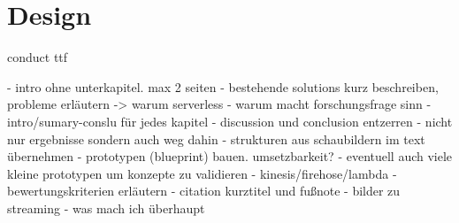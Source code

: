 \chapter{Design}

conduct ttf


- intro ohne unterkapitel. max 2 seiten
- bestehende solutions kurz beschreiben, probleme erläutern -> warum serverless
- warum macht forschungsfrage sinn
- intro/sumary-conslu für jedes kapitel
- discussion und conclusion entzerren
- nicht nur ergebnisse sondern auch weg dahin
- strukturen aus schaubildern im text übernehmen
- prototypen (blueprint) bauen. umsetzbarkeit?
- eventuell auch viele kleine prototypen um konzepte zu validieren
- kinesis/firehose/lambda
- bewertungskriterien erläutern
- citation kurztitel und fußnote
- bilder zu streaming
- was mach ich überhaupt 